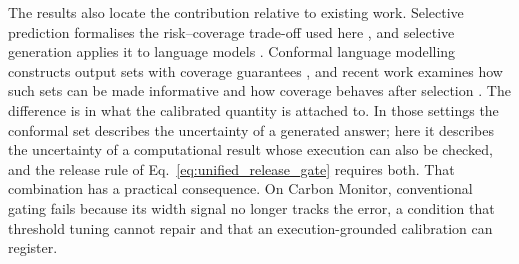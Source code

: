 \documentclass[preprint,12pt,authoryear]{elsarticle}
\begin{document}
The results also locate the contribution relative to existing work.
Selective prediction formalises the risk--coverage trade-off used here \citep{geifman2017selective,elyaniv2010foundations}, and selective generation applies it to language models \citep{lee2024selective}.
Conformal language modelling constructs output sets with coverage guarantees \citep{quach2024conformal,wang2024conu,cherian2024large}, and recent work examines how such sets can be made informative \citep{gazin2025selecting} and how coverage behaves after selection \citep{jin2025confidence}.
The difference is in what the calibrated quantity is attached to.
In those settings the conformal set describes the uncertainty of a generated answer; here it describes the uncertainty of a computational result whose execution can also be checked, and the release rule of Eq.~\eqref{eq:unified_release_gate} requires both.
That combination has a practical consequence.
On Carbon Monitor, conventional gating fails because its width signal no longer tracks the error, a condition that threshold tuning cannot repair and that an execution-grounded calibration can register.
\end{document}
